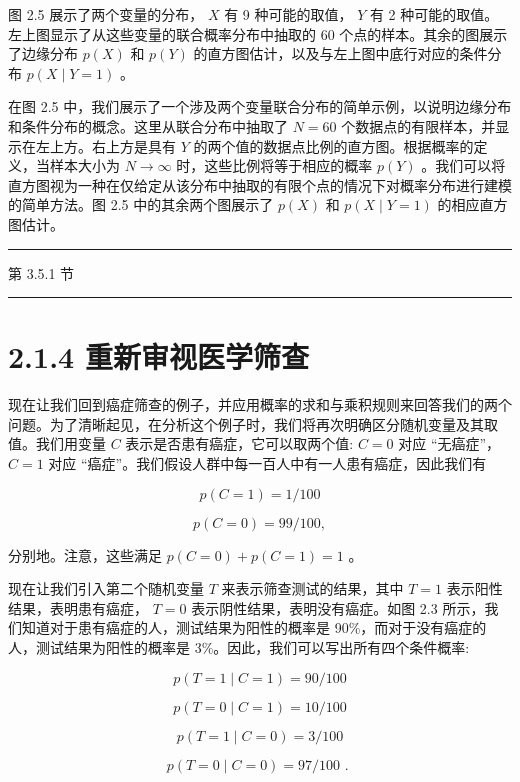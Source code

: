 \documentclass[10pt]{report}
\newcommand{\HRule}{\begin{center}\rule{0.9\linewidth}{0.2mm}\end{center}}
\begin{document}
图 2.5 展示了两个变量的分布， \(X\) 有 9 种可能的取值， \(Y\) 有 2 种可能的取值。左上图显示了从这些变量的联合概率分布中抽取的 60 个点的样本。其余的图展示了边缘分布 \(p\left( X\right)\) 和 \(p\left( Y\right)\) 的直方图估计，以及与左上图中底行对应的条件分布 \(p\left( {X \mid  Y = 1}\right)\) 。

在图 2.5 中，我们展示了一个涉及两个变量联合分布的简单示例，以说明边缘分布和条件分布的概念。这里从联合分布中抽取了 \(N = {60}\) 个数据点的有限样本，并显示在左上方。右上方是具有 \(Y\) 的两个值的数据点比例的直方图。根据概率的定义，当样本大小为 \(N \rightarrow  \infty\) 时，这些比例将等于相应的概率 \(p\left( Y\right)\) 。我们可以将直方图视为一种在仅给定从该分布中抽取的有限个点的情况下对概率分布进行建模的简单方法。图 2.5 中的其余两个图展示了 \(p\left( X\right)\) 和 \(p\left( {X \mid  Y = 1}\right)\) 的相应直方图估计。

\HRule

第 3.5.1 节

\HRule

\section*{2.1.4 重新审视医学筛查}

现在让我们回到癌症筛查的例子，并应用概率的求和与乘积规则来回答我们的两个问题。为了清晰起见，在分析这个例子时，我们将再次明确区分随机变量及其取值。我们用变量 \(C\) 表示是否患有癌症，它可以取两个值: \(C = 0\) 对应 “无癌症”， \(C = 1\) 对应 “癌症”。我们假设人群中每一百人中有一人患有癌症，因此我们有

\[
p\left( {C = 1}\right)  = 1/{100} \tag{2.12}
\]

\[
p\left( {C = 0}\right)  = {99}/{100}, \tag{2.13}
\]

分别地。注意，这些满足 \(p\left( {C = 0}\right)  + p\left( {C = 1}\right)  = 1\) 。

现在让我们引入第二个随机变量 \(T\) 来表示筛查测试的结果，其中 \(T = 1\) 表示阳性结果，表明患有癌症， \(T = 0\) 表示阴性结果，表明没有癌症。如图 2.3 所示，我们知道对于患有癌症的人，测试结果为阳性的概率是 90\%，而对于没有癌症的人，测试结果为阳性的概率是 3\%。因此，我们可以写出所有四个条件概率:

\[
p\left( {T = 1 \mid  C = 1}\right)  = {90}/{100} \tag{2.14}
\]

\[
p\left( {T = 0 \mid  C = 1}\right)  = {10}/{100} \tag{2.15}
\]

\[
p\left( {T = 1 \mid  C = 0}\right)  = 3/{100} \tag{2.16}
\]

\[
p\left( {T = 0 \mid  C = 0}\right)  = {97}/{100}\text{ . } \tag{2.17}
\]
\end{document}
